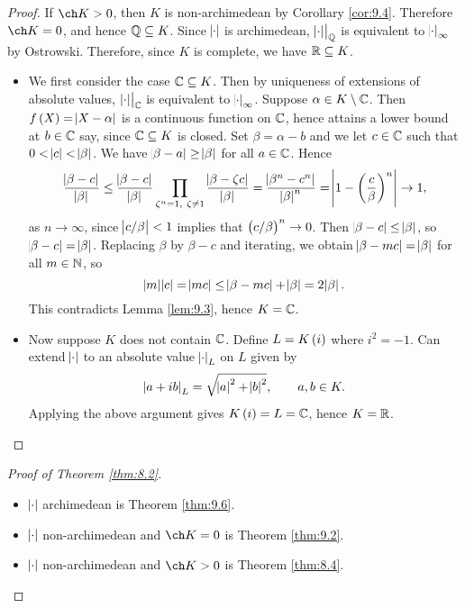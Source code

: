\begin{proof}
If $ \ch K > 0 $, then $ K $ is non-archimedean by Corollary \ref{cor:9.4}. Therefore $ \ch K = 0 $, and hence $ \mathbb{Q} \subseteq K $. Since $ \abs{\cdot} $ is archimedean, $ \left. \abs{\cdot} \right|_{\mathbb{Q}} $ is equivalent to $ \abs{\cdot}_\infty $ by Ostrowski. Therefore, since $ K $ is complete, we have $ \mathbb{R} \subseteq K $.
\begin{itemize}
\item We first consider the case $ \mathbb{C} \subseteq K $. Then by uniqueness of extensions of absolute values, $ \left. \abs{\cdot} \right|_{\mathbb{C}} $ is equivalent to $ \abs{\cdot}_\infty $. Suppose $ \alpha \in K \setminus \mathbb{C} $. Then $ f\br{X} = \abs{X - \alpha} $ is a continuous function on $ \mathbb{C} $, hence attains a lower bound at $ b \in \mathbb{C} $ say, since $ \mathbb{C} \subseteq K $ is closed. Set $ \beta = \alpha - b $ and we let $ c \in \mathbb{C} $ such that $ 0 < \abs{c} < \abs{\beta} $. We have $ \abs{\beta - a} \ge \abs{\beta} $ for all $ a \in \mathbb{C} $. Hence
$$ \dfrac{\abs{\beta - c}}{\abs{\beta}} \le \dfrac{\abs{\beta - c}}{\abs{\beta}}\prod_{\zeta^n = 1, \ \zeta \ne 1} \dfrac{\abs{\beta - \zeta c}}{\abs{\beta}} = \dfrac{\abs{\beta^n - c^n}}{\abs{\beta}^n} = \abs{1 - \br{\dfrac{c}{\beta}}^n} \to 1, $$
as $ n \to \infty $, since $ \abs{c / \beta} < 1 $ implies that $ \br{c / \beta}^n \to 0 $. Then $ \abs{\beta - c} \le \abs{\beta} $, so $ \abs{\beta - c} = \abs{\beta} $. Replacing $ \beta $ by $ \beta - c $ and iterating, we obtain $ \abs{\beta - mc} = \abs{\beta} $ for all $ m \in \mathbb{N} $, so
$$ \abs{m}\abs{c} = \abs{mc} \le \abs{\beta - mc} + \abs{\beta} = 2\abs{\beta}. $$
This contradicts Lemma \ref{lem:9.3}, hence $ K = \mathbb{C} $.
\item Now suppose $ K $ does not contain $ \mathbb{C} $. Define $ L = K\br{i} $ where $ i^2 = -1 $. Can extend $ \abs{\cdot} $ to an absolute value $ \abs{\cdot}_L $ on $ L $ given by
$$ \abs{a + ib}_L = \sqrt{\abs{a}^2 + \abs{b}^2}, \qquad a, b \in K. $$
Applying the above argument gives $ K\br{i} = L = \CC $, hence $ K = \mathbb{R} $.
\end{itemize}
\end{proof}

\begin{proof}[Proof of Theorem \ref{thm:8.2}]
\hfill
\begin{itemize}
\item $ \abs{\cdot} $ archimedean is Theorem \ref{thm:9.6}.
\item $ \abs{\cdot} $ non-archimedean and $ \ch K = 0 $ is Theorem \ref{thm:9.2}.
\item $ \abs{\cdot} $ non-archimedean and $ \ch K > 0 $ is Theorem \ref{thm:8.4}.
\end{itemize}
\end{proof}

